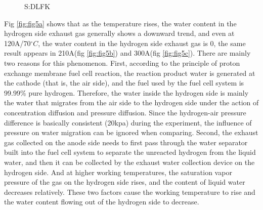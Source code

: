 \begin{figure}[ht]
	\caption{S:DLFK}
\end{figure}
		

\par
Fig \ref{fig:fig5a} shows that as the temperature rises, the water content in the hydrogen side exhaust gas generally shows a downward trend, and even at 120A/70$^{\circ}C$, the water content in the hydrogen side exhaust gas is 0, the same result appears in 210A(fig \ref{fig:fig5b}) and 300A(fig \ref{fig:fig5c}). There are mainly two reasons for this phenomenon.  First, according to the principle of proton exchange membrane fuel cell reaction, the reaction product water is generated at the cathode (that is, the air side), and the fuel used by the fuel cell system is 99.99\% pure hydrogen. Therefore, the water inside the hydrogen side is mainly the water that migrates from the air side to the hydrogen side under the action of concentration diffusion and pressure diffusion. Since the hydrogen-air pressure difference is basically consistent (20kpa) during the experiment, the influence of pressure on water migration can be ignored when comparing. Second, the exhaust gas collected on the anode side needs to first pass through the water separator built into the fuel cell system to separate the unreacted hydrogen from the liquid water, and then it can be collected by the exhaust water collection device on the hydrogen side. And at higher working temperatures, the saturation vapor pressure of the gas on the hydrogen side rises, and the content of liquid water decreases relatively. These two factors cause the working temperature to rise and the water content flowing out of the hydrogen side to decrease.


